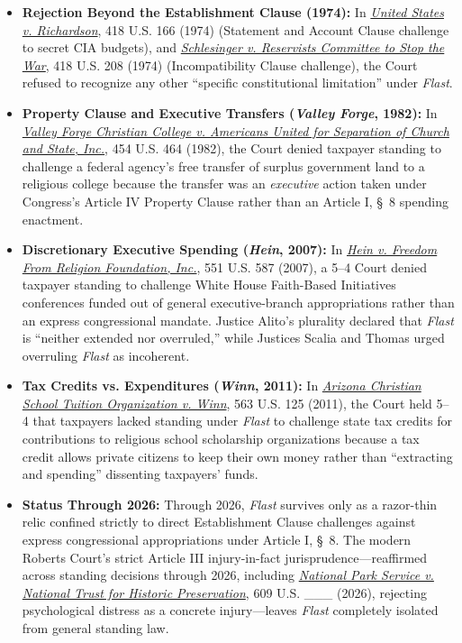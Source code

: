 \documentclass[12pt]{article}
\begin{document}
\begin{itemize}
  \item \textbf{Rejection Beyond the Establishment Clause (1974):} In \href{https://supreme.justia.com/cases/federal/us/418/166/}{\textit{United States v. Richardson}}, 418 U.S. 166 (1974) (Statement and Account Clause challenge to secret CIA budgets), and \href{https://supreme.justia.com/cases/federal/us/418/208/}{\textit{Schlesinger v. Reservists Committee to Stop the War}}, 418 U.S. 208 (1974) (Incompatibility Clause challenge), the Court refused to recognize any other ``specific constitutional limitation'' under \textit{Flast}.
  \item \textbf{Property Clause and Executive Transfers (\textit{Valley Forge}, 1982):} In \href{https://supreme.justia.com/cases/federal/us/454/464/}{\textit{Valley Forge Christian College v. Americans United for Separation of Church and State, Inc.}}, 454 U.S. 464 (1982), the Court denied taxpayer standing to challenge a federal agency's free transfer of surplus government land to a religious college because the transfer was an \textit{executive} action taken under Congress's Article IV Property Clause rather than an Article I, \S\ 8 spending enactment.
  \item \textbf{Discretionary Executive Spending (\textit{Hein}, 2007):} In \href{https://supreme.justia.com/cases/federal/us/551/587/}{\textit{Hein v. Freedom From Religion Foundation, Inc.}}, 551 U.S. 587 (2007), a 5--4 Court denied taxpayer standing to challenge White House Faith-Based Initiatives conferences funded out of general executive-branch appropriations rather than an express congressional mandate. Justice Alito's plurality declared that \textit{Flast} is ``neither extended nor overruled,'' while Justices Scalia and Thomas urged overruling \textit{Flast} as incoherent.
  \item \textbf{Tax Credits vs. Expenditures (\textit{Winn}, 2011):} In \href{https://supreme.justia.com/cases/federal/us/563/125/}{\textit{Arizona Christian School Tuition Organization v. Winn}}, 563 U.S. 125 (2011), the Court held 5--4 that taxpayers lacked standing under \textit{Flast} to challenge state tax credits for contributions to religious school scholarship organizations because a tax credit allows private citizens to keep their own money rather than ``extracting and spending'' dissenting taxpayers' funds.
  \item \textbf{Status Through 2026:} Through 2026, \textit{Flast} survives only as a razor-thin relic confined strictly to direct Establishment Clause challenges against express congressional appropriations under Article I, \S\ 8. The modern Roberts Court's strict Article III injury-in-fact jurisprudence---reaffirmed across standing decisions through 2026, including \href{https://supreme.justia.com/cases/federal/us/609/26a203/}{\textit{National Park Service v. National Trust for Historic Preservation}}, 609 U.S. \_\_\_ (2026), rejecting psychological distress as a concrete injury---leaves \textit{Flast} completely isolated from general standing law.
\end{itemize}
\end{document}
